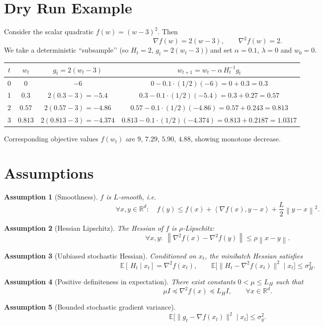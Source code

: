 \documentclass{article}
\newtheorem{assumption}{Assumption}
\newcommand{\EE}{\mathbb{E}}
\newcommand{\RR}{\mathbb{R}}
\newcommand{\norm}[1]{\left\|#1\right\|}
\newcommand{\ip}[2]{\left\langle #1,#2\right\rangle}
\begin{document}
\section*{Dry Run Example}
Consider the scalar quadratic $f(w)=(w-3)^2$.  Then
\[
\nabla f(w)=2(w-3),\qquad \nabla^2 f(w)=2 .
\]
We take a deterministic ``subsample’’ (so $H_t=2$, $g_t=2(w_t-3)$) and set
$\alpha=0.1$, $\lambda=0$ and $w_0=0$.

\begin{center}
\begin{tabular}{c|c|c|c}
$t$ & $w_t$ & $g_t=2(w_t-3)$ & $w_{t+1}=w_t-\alpha\,H_t^{-1}g_t$\\ \hline
0 & $0$ & $-6$ & $0-0.1\cdot(1/2)(-6)=0+0.3=0.3$\\
1 & $0.3$ & $2(0.3-3)=-5.4$ & $0.3-0.1\cdot(1/2)(-5.4)=0.3+0.27=0.57$\\
2 & $0.57$ & $2(0.57-3)=-4.86$ & $0.57-0.1\cdot(1/2)(-4.86)=0.57+0.243=0.813$\\
3 & $0.813$ & $2(0.813-3)=-4.374$ & $0.813-0.1\cdot(1/2)(-4.374)=0.813+0.2187=1.0317$
\end{tabular}
\end{center}
Corresponding objective values $f(w_t)$ are $9$, $7.29$, $5.90$, $4.88$, showing monotone decrease.

\newpage
\section*{Assumptions}
\begin{assumption}[Smoothness]\label{A:smooth}
$f$ is $L$‑smooth, i.e.
\[
\forall x,y\in\RR^{d}:\quad 
f(y)\le f(x)+\ip{\nabla f(x)}{y-x}+\frac{L}{2}\norm{y-x}^{2}.
\tag{2}
\]
\end{assumption}
\begin{assumption}[Hessian Lipschitz]\label{A:hesslip}
The Hessian of $f$ is $\rho$‑Lipschitz:
\[
\forall x,y:\;\norm{\nabla^{2}f(x)-\nabla^{2}f(y)}\le\rho\norm{x-y}.
\tag{3}
\]
\end{assumption}
\begin{assumption}[Unbiased stochastic Hessian]\label{A:unbiased}
Conditioned on $x_t$, the minibatch Hessian satisfies
\[
\EE[\,H_t\mid x_t]=\nabla^{2}f(x_t),\qquad 
\EE\bigl[\|H_t-\nabla^{2}f(x_t)\|^{2}\mid x_t\bigr]\le\sigma_{H}^{2}.
\tag{4}
\]
\end{assumption}
\begin{assumption}[Positive definiteness in expectation]\label{A:pd}
There exist constants $0<\mu\le L_H$ such that
\[
\mu I \preceq \nabla^{2}f(x) \preceq L_H I,\qquad\forall x\in\RR^{d}.
\tag{5}
\]
\end{assumption}
\begin{assumption}[Bounded stochastic gradient variance]\label{A:gradvar}
\[
\EE\bigl[\|g_t-\nabla f(x_t)\|^{2}\mid x_t\bigr]\le\sigma_{g}^{2}.
\tag{6}
\]
\end{assumption}
\end{document}
